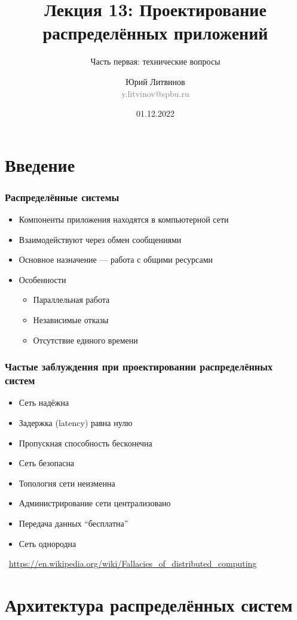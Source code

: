 \documentclass[xetex,mathserif,serif]{beamer}
\title[Проектирование распределённых приложений]{Лекция 13: Проектирование распределённых приложений}
\subtitle{Часть первая: технические вопросы}
\author[Юрий Литвинов]{Юрий Литвинов\\\small{\textcolor{gray}{y.litvinov@spbu.ru}}}
\date{01.12.2022}
\newcommand{\attribution}[1] {
    \vspace{-5mm}\begin{flushright}\begin{scriptsize}\textcolor{gray}{\textcopyright\, #1}\end{scriptsize}\end{flushright}
}
\begin{document}
    
    \frame{\titlepage}

    \section{Введение}

    \begin{frame}
        \frametitle{Распределённые системы}
        \begin{itemize}
            \item Компоненты приложения находятся в компьютерной сети
            \item Взаимодействуют через обмен сообщениями
            \item Основное назначение --- работа с общими ресурсами
            \item Особенности
            \begin{itemize}
                \item Параллельная работа
                \item Независимые отказы
                \item Отсутствие единого времени
            \end{itemize}
        \end{itemize}
    \end{frame}

    \begin{frame}
        \frametitle{Частые заблуждения при проектировании распределённых систем}
        \begin{itemize}
            \item Сеть надёжна
            \item Задержка (latency) равна нулю
            \item Пропускная способность бесконечна
            \item Сеть безопасна
            \item Топология сети неизменна
            \item Администрирование сети централизовано
            \item Передача данных ``бесплатна''
            \item Сеть однородна
        \end{itemize}
        \attribution{\url{https://en.wikipedia.org/wiki/Fallacies_of_distributed_computing}}
    \end{frame}

    \section{Архитектура распределённых систем}
\end{document}

